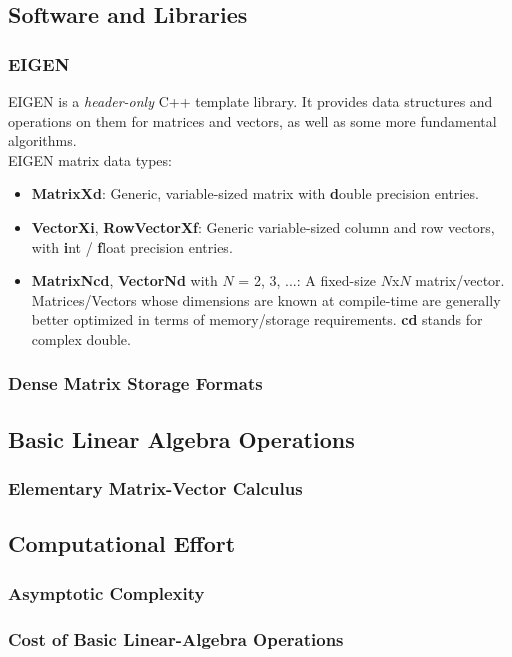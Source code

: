 \documentclass[12pt]{article}
\begin{document}
\subsection{Software and Libraries}
\subsubsection{EIGEN}
EIGEN is a \textit{header-only} C++ template library. It provides data structures and operations on them for matrices and vectors, as well as some more fundamental algorithms.\\%
EIGEN matrix data types:
\begin{itemize}
\item \textbf{MatrixXd}: Generic, variable-sized matrix with \textbf{d}ouble precision entries.
\item \textbf{VectorXi}, \textbf{RowVectorXf}: Generic variable-sized column and row vectors, with \textbf{i}nt / \textbf{f}loat precision entries.
\item \textbf{MatrixNcd}, \textbf{VectorNd} with $N$ = 2, 3, ...: A fixed-size $N$x$N$ matrix/vector. Matrices/Vectors whose dimensions are known at compile-time are generally better optimized in terms of memory/storage requirements. \textbf{cd} stands for complex double.
\end{itemize}

\subsubsection{Dense Matrix Storage Formats}
\subsection{Basic Linear Algebra Operations}
\subsubsection{Elementary Matrix-Vector Calculus}
\subsection{Computational Effort}
\subsubsection{Asymptotic Complexity}
\subsubsection{Cost of Basic Linear-Algebra Operations}
\end{document}
